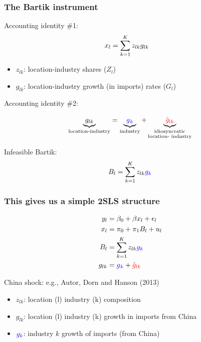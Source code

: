 \documentclass[notes,11pt, aspectratio=169]{beamer}
\begin{document}
\begin{frame}
\frametitle{The Bartik instrument}

Accounting identity \#1:
\begin{align}
  x_l &=  \sum_{k=1}^{K} z_{lk} g_{lk} \notag  
\end{align}
\begin{itemize}
\setlength\itemsep{1em}
  \item $z_{lk}$: location-industry shares  ($Z_l$)
  \item $g_{lk} $: location-industry growth (in imports) rates ($G_l$) 
  \end{itemize}
Accounting identity \#2:

$$\underbrace{ g_{lk}}_{\text{location-industry}} = \underbrace{  \textcolor{blue}{g}_{ \textcolor{blue}{k}}}_{\text{industry}} + \underbrace{  \textcolor{red}{\tilde{g}_{lk}}   }_{\substack{\text{idiosyncratic} \\ \text{location- industry}}} $$ 

Infeasible Bartik:
$$B_l = \sum_{k=1}^{K}z_{lk} \textcolor{blue}{g_{k}}$$

\end{frame}


\begin{frame}
\frametitle{This gives us a simple 2SLS structure}

\begin{align}
  y_l&= \beta_0 + \beta x_l + \epsilon_l \notag \\
  x_l&= \pi_0 + \pi_{1} B_l + u_l \notag \\  
  B_l &=  \sum_{k=1}^{K}z_{lk} \textcolor{blue}{g_{k}} \notag \\
  g_{lk} &=   \textcolor{blue}{g}_{ \textcolor{blue}{k}}+  \textcolor{red}{\tilde{g}_{lk}}  \notag 
\end{align}



China shock: e.g., Autor, Dorn and Hanson (2013)  
\begin{itemize}
\item $z_{lk}$: location (l) industry (k) composition
\item $g_{lk}$:  location (l)  industry (k) growth in imports from China
\item $\textcolor{blue}{g_k}$: industry $k$  growth of imports (from China)
\end{itemize}


\end{frame}
\end{document}
